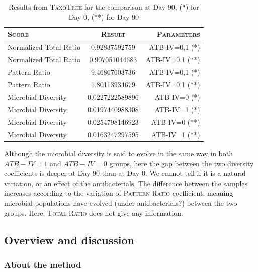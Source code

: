 \documentclass{report}
\begin{document}
\begin{itemize}
     \begin{table}
       \caption{Results from \textsc{TaxoTree} for the comparison at Day 90, (*) for Day 0, (**) for Day 90}
       \begin{tabular}{|l|c|r|}
         \hline
         \textsc{Score} & \textsc{Result} & \textsc{Parameters}\\
         \hline
         Normalized Total Ratio & 0.92837592759 & ATB-IV=0,1 (*)\\
         \hline
         Normalized Total Ratio & 0.907051044683 & ATB-IV=0,1 (**)\\
         \hline
         Pattern Ratio & 9.46867603736 & ATB-IV=0,1 (*) \\
         \hline
         Pattern Ratio & 1.80113934679 & ATB-IV=0,1 (**) \\
         \hline
         Microbial Diversity & 0.0227222589896 & ATB-IV=0 (*)\\
         \hline
         Microbial Diversity & 0.0197440988308 & ATB-IV=1 (*)\\
         \hline
         Microbial Diversity & 0.0254798146923 & ATB-IV=0 (**)\\
         \hline
         Microbial Diversity & 0.0163247297595 & ATB-IV=1 (**)\\
         \hline
       \end{tabular}
     \end{table}

Although the microbial diversity is said to evolve in the same way in both $ATB-IV = 1$ and $ATB-IV = 0$ groups, here the gap between the two diversity coefficients is deeper at Day 90 than at Day 0. We cannot tell if it is a natural variation, or an effect of the antibacterials. The difference between the samples increases according to the variation of \textsc{Pattern Ratio} coefficient, meaning microbial populations have evolved (under antibacterials?) between the two groups. Here, \textsc{Total Ratio} does not give any information.

\end{itemize}

\subsection{Overview and discussion}

\subsubsection{About the method}
\end{document}
